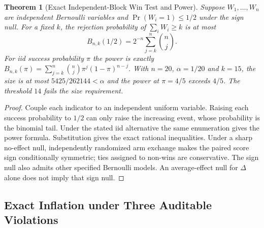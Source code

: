 \documentclass[11pt,a4paper]{article}
\newtheorem{theorem}{Theorem}[section]
\theoremstyle{definition}
\begin{document}
\begin{theorem}[Exact Independent-Block Win Test and Power]\label{thm:campaign-block-sign-test}
Suppose $W_1,\ldots,W_n$ are independent Bernoulli variables and $\Pr(W_i=1)\le1/2$ under the sign null. For a fixed $k$, the rejection probability of $\sum_i W_i\ge k$ is at most
\[
 B_{n,k}(1/2)=2^{-n}\sum_{j=k}^n {n\choose j}.
\]
For iid success probability $\pi$ the power is exactly $B_{n,k}(\pi)=\sum_{j=k}^n{n\choose j}\pi^j(1-\pi)^{n-j}$. With $n=20$, $\alpha=1/20$ and $k=15$, the size is at most $5425/262144<\alpha$ and the power at $\pi=4/5$ exceeds $4/5$. The threshold $14$ fails the size requirement.
\end{theorem}
\begin{proof}
Couple each indicator to an independent uniform variable. Raising each success probability to $1/2$ can only raise the increasing event, whose probability is the binomial tail. Under the stated iid alternative the same enumeration gives the power formula. Substitution gives the exact rational inequalities. Under a sharp no-effect null, independently randomized arm exchange makes the paired score sign conditionally symmetric; ties assigned to non-wins are conservative. The sign null also admits other specified Bernoulli models. An average-effect null for $\Delta$ alone does not imply that sign null.
\end{proof}

\subsection{Exact Inflation under Three Auditable Violations}
\end{document}
